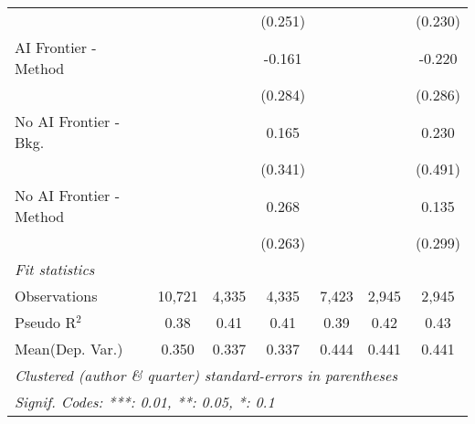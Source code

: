 \begin{tabular}{lcccccc}
                           &               &             & (0.251)      &               &              & (0.230)\\   
   AI Frontier - Method    &               &             & -0.161       &               &              & -0.220\\   
                           &               &             & (0.284)      &               &              & (0.286)\\   
   No AI Frontier - Bkg.   &               &             & 0.165        &               &              & 0.230\\   
                           &               &             & (0.341)      &               &              & (0.491)\\   
   No AI Frontier - Method &               &             & 0.268        &               &              & 0.135\\   
                           &               &             & (0.263)      &               &              & (0.299)\\   
   \midrule
   \emph{Fit statistics}\\
   Observations            & 10,721        & 4,335       & 4,335        & 7,423         & 2,945        & 2,945\\  
   Pseudo R$^2$            & 0.38          & 0.41        & 0.41         & 0.39          & 0.42         & 0.43\\  
Mean(Dep. Var.) & 0.350 & 0.337 & 0.337 & 0.444 & 0.441 & 0.441 \\
   \midrule \midrule
   \multicolumn{7}{l}{\emph{Clustered (author \& quarter) standard-errors in parentheses}}\\
   \multicolumn{7}{l}{\emph{Signif. Codes: ***: 0.01, **: 0.05, *: 0.1}}\\
\end{tabular}
\par\endgroup
